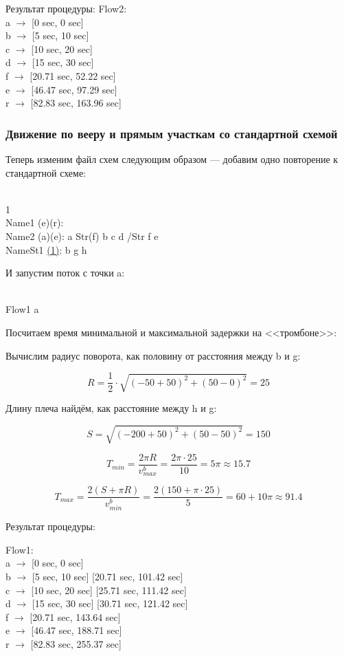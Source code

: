 \documentclass[12pt, a4 paper]{article}
\theoremstyle{plain}
\begin{document}
Результат процедуры:
Flow2:\\
a $\rightarrow$ [0 sec, 0 sec]\\
b $\rightarrow$ [5 sec, 10 sec]\\
c $\rightarrow$ [10 sec, 20 sec]\\
d $\rightarrow$ [15 sec, 30 sec]\\
f $\rightarrow$ [20.71 sec, 52.22 sec]\\
e $\rightarrow$ [46.47 sec, 97.29 sec]\\
r $\rightarrow$ [82.83 sec, 163.96 sec]\\



\subsubsection{Движение по вееру и прямым участкам со стандартной схемой}

Теперь изменим файл схем следующим образом --- добавим одно повторение к стандартной схеме:

\\
1\\
Name1 (e)(r):\\
Name2 (a)(e): a Str(f) b c d /Str f e\\
NameSt1 \underline{(1)}: b g h

И запустим поток с точки a:

\\
Flow1 a

Посчитаем время минимальной и максимальной задержки на <<тромбоне>>:

Вычислим радиус поворота, как половину от расстояния между b и g:

$$
 R = \frac{1}{2} \cdot \sqrt{(-50 + 50)^2 + (50 - 0)^2} = 25
$$

Длину плеча найдём, как расстояние между h и g:

$$
S = \sqrt{(-200 + 50)^2 + (50 - 50)^2} = 150
$$

$$
T_{min} = \frac{2 \pi R}{v_{max}^b} = \frac{2 \pi \cdot 25}{10} = 5\pi \approx 15.7
$$

$$
T_{max} = \frac{2(S + \pi R)}{v_{min}^b} = \frac{2(150 + \pi \cdot 25)}{5} = 60 + 10\pi \approx 91.4
$$

Результат процедуры:

\noindent Flow1:\\
a $\rightarrow$ [0 sec, 0 sec]\\
b $\rightarrow$ [5 sec, 10 sec] [20.71 sec, 101.42 sec]\\
c $\rightarrow$ [10 sec, 20 sec] [25.71 sec, 111.42 sec]\\
d $\rightarrow$ [15 sec, 30 sec] [30.71 sec, 121.42 sec]\\
f $\rightarrow$ [20.71 sec, 143.64 sec]\\
e $\rightarrow$ [46.47 sec, 188.71 sec]\\
r $\rightarrow$ [82.83 sec, 255.37 sec]\\
\end{document}
